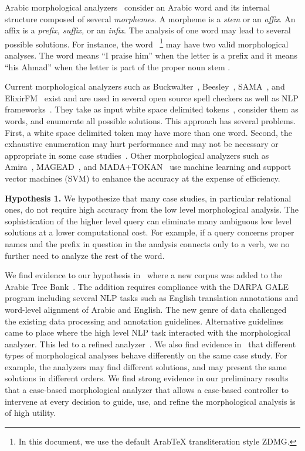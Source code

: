 \documentclass[12pt]{article}
\begin{document}
{Arabic morphological analyzers~\cite{Sughaiyer:04}
consider an Arabic word and its internal structure composed of 
several {\em morphemes}. 
A morpheme is a {\em stem} or an {\em affix}.
An affix is a {\em prefix, suffix,} or an {\em infix}.
The analysis of one word may lead to several possible
solutions.
\vocalize
For instance, the word 
~\footnote{In this document, we use the default 
ArabTeX transliteration style ZDMG.}
may have two valid morphological analyses. 
The word means ``I praise him'' when
the letter  is a prefix and  it means
``his Ahmad'' when 
the letter  is part of the proper noun stem 
.
\novocalize

Current morphological analyzers such as 
Buckwalter~\cite{Buckwalter:02},
Beesley~\cite{Beesley:01}, SAMA~\cite{Kulick:10},
and ElixirFM~\cite{Otakar:07} exist
and are used in several open source spell checkers as 
well as NLP frameworks~\cite{Col09}.
They take as input white space delimited tokens~\cite{Kulick:10},
consider them as words,
and enumerate all possible solutions. 
This approach has several problems. 
First, a white space delimited token may have 
more than one word.
Second, the exhaustive enumeration may hurt performance and may
not be necessary or appropriate
in some case studies~\cite{Maamouri:10}. 
Other morphological analyzers such as 
Amira~\cite{Diab:07,Benajiba:07},
MAGEAD~\cite{Habash:05}, and MADA+TOKAN~\cite{Habash:09} 
use machine learning and support vector machines (SVM) 
to enhance the accuracy at the expense of efficiency.

{\bf Hypothesis 1.} We hypothesize that many case studies, 
in particular relational ones, 
do not require high accuracy from the 
low level morphological analysis.
The sophistication of the higher level query can eliminate 
many ambiguous low level solutions at a lower computational 
cost.
For example, if a query concerns proper names and the 
prefix in question in the analysis connects only to a verb, 
we no further need to analyze the rest of the word.

We find evidence to our hypothesis in~\cite{Maamouri:10} where
a new corpus was added to the Arabic Tree Bank~\cite{Maamouri:04}.
The addition requires compliance with 
the DARPA GALE program including several NLP tasks such as 
English translation annotations and word-level alignment
of Arabic and English. 
The new genre of data challenged the existing data processing 
and annotation guidelines. 
Alternative guidelines came to place where the 
high level NLP task interacted with the 
morphological analyzer.%
This led to a refined analyzer~\cite{Kulick:10}.  
We also find evidence in~\cite{Habash:06} that different types of 
morphological analyses behave differently on the same case study. 
For example, the analyzers may find different solutions, and may 
present the same solutions in different orders.
We find strong evidence in our preliminary
results that a 
case-based morphological analyzer that allows a 
case-based controller to intervene at every decision to 
guide, use, and refine the morphological analysis
is of high utility.

}
\end{document}
